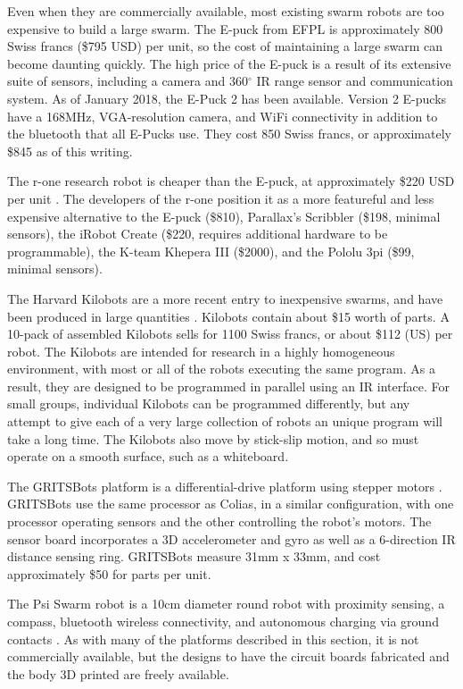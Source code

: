 Even when they are commercially available, most existing swarm robots are too expensive to build a large swarm.
The E-puck from EFPL is approximately 800 Swiss francs (\$795 USD) per unit, so the cost of maintaining a large swarm can become daunting quickly. 
The high price of the E-puck is a result of its extensive suite of sensors, including a camera and 360$^{\circ}$ IR range sensor and communication system. 
As of January 2018, the E-Puck 2 has been available. 
Version 2 E-pucks have a 168MHz, VGA-resolution camera, and WiFi connectivity in addition to the bluetooth that all E-Pucks use. 
They cost 850 Swiss francs, or approximately \$845 as of this writing. 

The r-one research robot is cheaper than the E-puck, at approximately \$220 USD per unit \citep{mclurkin2013low}. 
The developers of the r-one position it as a more featureful and less expensive alternative to the E-puck (\$810), Parallax's Scribbler (\$198, minimal sensors), the iRobot Create (\$220, requires additional hardware to be programmable), the K-team Khepera III (\$2000), and the Pololu 3pi (\$99, minimal sensors). 

The Harvard Kilobots are a more recent entry to inexpensive swarms, and have been produced in large quantities \citep{rubenstein2014kilobot}. 
Kilobots contain about \$15 worth of parts. 
A 10-pack of assembled Kilobots sells for 1100 Swiss francs, or about \$112 (US) per robot. 
The Kilobots are intended for research in a highly homogeneous environment, with most or all of the robots executing the same program. 
As a result, they are designed to be programmed in parallel using an IR interface. 
For small groups, individual Kilobots can be programmed differently, but any attempt to give each of a very large collection of robots an unique program will take a long time. 
The Kilobots also move by stick-slip motion, and so must operate on a smooth surface, such as a whiteboard. 

The GRITSBots platform is a differential-drive platform using stepper motors \citep{pickem2015gritsbot}.
GRITSBots use the same processor as Colias, in a similar configuration, with one processor operating sensors and the other controlling the robot's motors. 
The sensor board incorporates a 3D accelerometer and gyro as well as a 6-direction IR distance sensing ring. 
GRITSBots measure 31mm x 33mm, and cost approximately \$50 for parts per unit. 

The Psi Swarm robot is a 10cm diameter round robot with proximity sensing, a compass, bluetooth wireless connectivity, and autonomous charging via ground contacts \citep{hilder2016psi}.
As with many of the platforms described in this section, it is not commercially available, but the designs to have the circuit boards fabricated and the body 3D printed are freely available. 

